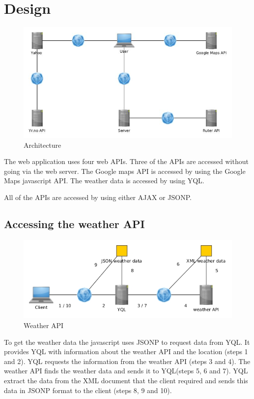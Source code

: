 \documentclass[10pt,a4paper]{article}
\begin{document}
\section{Design}
\begin{figure}
\centering
\includegraphics[width=\textwidth]{../arch/arch}
\caption{Architecture}
\label{arch}
\end{figure}
The web application uses four web APIs. Three of the APIs are accessed without going via the web server. The Google maps API is accessed by using the Google Maps javascript API. The weather data is accessed by using YQL. 

All of the APIs are accessed by using either AJAX or JSONP.

\subsection{Accessing the weather API}
\begin{figure}
\centering
\includegraphics[width=\textwidth]{../weather/access}
\caption{Weather API}
\label{weather}
\end{figure}

To get the weather data the javascript uses JSONP to request data from YQL. It provides YQL with information about the weather API and the location (steps 1 and 2). YQL requests the information from the weather API (steps 3 and 4). The weather API finds the weather data and sends it to YQL(steps 5, 6 and 7). YQL extract the data from the XML document that the client required and sends this data in JSONP format to the client (steps 8, 9 and 10).
\end{document}

